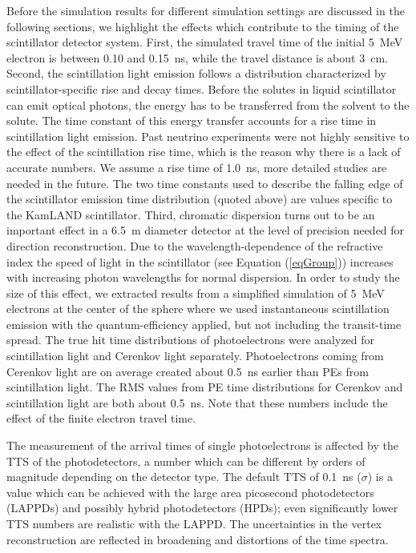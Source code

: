 \documentclass[aps,prc,twocolumn,groupedaddress,showpacs,amsmath,amssymb,floatfix,superscriptaddress]{revtex4}
\begin{document}
Before the simulation results for different simulation settings are
discussed in the following sections, we highlight the effects which
contribute to the timing of the scintillator detector system. First,
the simulated travel time of the initial 5~MeV electron is between
0.10 and 0.15~ns, while the travel distance is about 3~cm. Second, the
scintillation light emission follows a distribution characterized by
scintillator-specific rise and decay times. Before the solutes in
liquid scintillator can emit optical photons, the energy has to be
transferred from the solvent to the solute. The time constant of this
energy transfer accounts for a rise time in scintillation light
emission. Past neutrino experiments were not highly sensitive to the
effect of the scintillation rise time, which is the reason why there
is a lack of accurate numbers. We assume a rise time of 1.0~ns, more
detailed studies are needed in the future. The two time constants used
to describe the falling edge of the scintillator emission time
distribution (quoted above) are values specific to the KamLAND
scintillator. Third, chromatic dispersion turns out to be an important
effect in a 6.5~m diameter detector at the level of precision needed
for direction reconstruction. Due to the wavelength-dependence of the
refractive index the speed of light in the scintillator (see Equation
(\ref{eqGroup})) increases with increasing photon wavelengths for
normal dispersion. In order to study the size of this effect, we
extracted results from a simplified simulation of 5~MeV electrons at
the center of the sphere where we used instantaneous scintillation
emission with the quantum-efficiency applied, but not including
the transit-time spread. The true hit time distributions of
photoelectrons were analyzed for scintillation light and Cerenkov
light separately. Photoelectrons coming from Cerenkov light are on
average created about 0.5~ns earlier than PEs from scintillation
light. The RMS values from PE time distributions for Cerenkov and
scintillation light are both about 0.5~ns. Note that these numbers
include the effect of the finite electron travel time.

The measurement of the arrival times of single photoelectrons is
affected by the TTS of the photodetectors, a number which can be
different by orders of magnitude depending on the detector type. The
default TTS of 0.1~ns ($\sigma$) is a value which can be achieved with
the large area picosecond photodetectors
(LAPPDs)\cite{LAPPDSum,LAPPDTDR} and possibly hybrid photodetectors
(HPDs)\cite{hpdThesis}; even significantly lower TTS numbers are
realistic with the LAPPD. The uncertainties in the vertex
reconstruction are reflected in broadening and distortions of the time
spectra.
\end{document}
